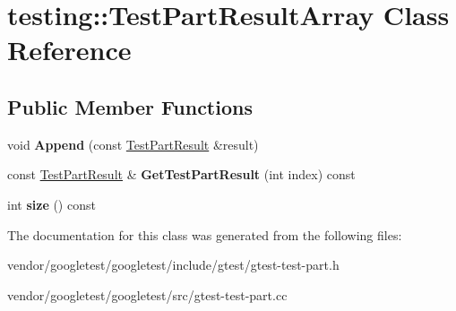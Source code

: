 \hypertarget{classtesting_1_1_test_part_result_array}{}\section{testing\+:\+:Test\+Part\+Result\+Array Class Reference}
\label{classtesting_1_1_test_part_result_array}
\subsection*{Public Member Functions}
\begin{DoxyCompactItemize}
\item 
\mbox{\label{classtesting_1_1_test_part_result_array_a01844bd505b18a666324617a1b459558}} 
void {\bfseries Append} (const \hyperlink{classtesting_1_1_test_part_result}{Test\+Part\+Result} \&result)
\item 
\mbox{\label{classtesting_1_1_test_part_result_array_aa44d02a01c87f47393b07951bab6e025}} 
const \hyperlink{classtesting_1_1_test_part_result}{Test\+Part\+Result} \& {\bfseries Get\+Test\+Part\+Result} (int index) const
\item 
\mbox{\label{classtesting_1_1_test_part_result_array_a31555f11ba42b81ddad0a26a87710d0a}} 
int {\bfseries size} () const
\end{DoxyCompactItemize}


The documentation for this class was generated from the following files\+:\begin{DoxyCompactItemize}
\item 
vendor/googletest/googletest/include/gtest/gtest-\/test-\/part.\+h\item 
vendor/googletest/googletest/src/gtest-\/test-\/part.\+cc\end{DoxyCompactItemize}
